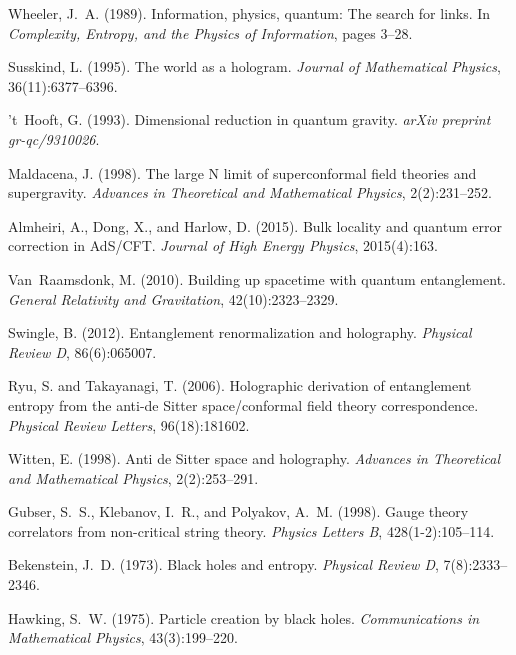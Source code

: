 \documentclass{article}
\begin{document}

\begin{thebibliography}{99}

Wheeler, J.~A. (1989). 
\newblock Information, physics, quantum: The search for links. 
\newblock In \emph{Complexity, Entropy, and the Physics of Information}, pages 3--28.

Susskind, L. (1995). 
\newblock The world as a hologram. 
\newblock \emph{Journal of Mathematical Physics}, 36(11):6377--6396.

't~Hooft, G. (1993). 
\newblock Dimensional reduction in quantum gravity. 
\newblock \emph{arXiv preprint gr-qc/9310026}.

Maldacena, J. (1998). 
\newblock The large N limit of superconformal field theories and supergravity. 
\newblock \emph{Advances in Theoretical and Mathematical Physics}, 2(2):231--252.

Almheiri, A., Dong, X., and Harlow, D. (2015). 
\newblock Bulk locality and quantum error correction in AdS/CFT. 
\newblock \emph{Journal of High Energy Physics}, 2015(4):163.

Van~Raamsdonk, M. (2010). 
\newblock Building up spacetime with quantum entanglement. 
\newblock \emph{General Relativity and Gravitation}, 42(10):2323--2329.

Swingle, B. (2012). 
\newblock Entanglement renormalization and holography. 
\newblock \emph{Physical Review D}, 86(6):065007.

Ryu, S. and Takayanagi, T. (2006). 
\newblock Holographic derivation of entanglement entropy from the anti-de Sitter space/conformal field theory correspondence. 
\newblock \emph{Physical Review Letters}, 96(18):181602.

Witten, E. (1998). 
\newblock Anti de Sitter space and holography. 
\newblock \emph{Advances in Theoretical and Mathematical Physics}, 2(2):253--291.

Gubser, S.~S., Klebanov, I.~R., and Polyakov, A.~M. (1998). 
\newblock Gauge theory correlators from non-critical string theory. 
\newblock \emph{Physics Letters B}, 428(1-2):105--114.

Bekenstein, J.~D. (1973). 
\newblock Black holes and entropy. 
\newblock \emph{Physical Review D}, 7(8):2333--2346.

Hawking, S.~W. (1975). 
\newblock Particle creation by black holes. 
\newblock \emph{Communications in Mathematical Physics}, 43(3):199--220.


\end{thebibliography}
\end{document}
